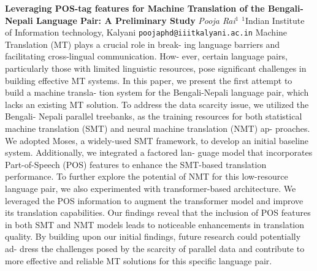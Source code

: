 
    \begin{conf-abstract}[]
        {\textbf{Leveraging POS-tag features for Machine Translation of the Bengali-Nepali Language Pair: A Preliminary Study}}
        {\textit{Pooja  Rai$^{1}$}}
        {$^{1}$Indian Institute of Information technology, Kalyani}
        {\texttt{poojaphd@iiitkalyani.ac.in}}
        {Machine Translation (MT) plays a crucial role in break- ing language barriers and facilitating cross-lingual communication. How- ever, certain language pairs, particularly those with limited linguistic resources, pose significant challenges in building effective MT systems. In this paper, we present the first attempt to build a machine transla- tion system for the Bengali-Nepali language pair, which lacks an existing MT solution. To address the data scarcity issue, we utilized the Bengali- Nepali parallel treebanks, as the training resources for both statistical machine translation (SMT) and neural machine translation (NMT) ap- proaches. We adopted Moses, a widely-used SMT framework, to develop an initial baseline system. Additionally, we integrated a factored lan- guage model that incorporates Part-of-Speech (POS) features to enhance the SMT-based translation performance. To further explore the potential of NMT for this low-resource language pair, we also experimented with transformer-based architecture. We leveraged the POS information to augment the transformer model and improve its translation capabilities. Our findings reveal that the inclusion of POS features in both SMT and NMT models leads to noticeable enhancements in translation quality. By building upon our initial findings, future research could potentially ad- dress the challenges posed by the scarcity of parallel data and contribute to more effective and reliable MT solutions for this specific language pair.}
    \end{conf-abstract}
        